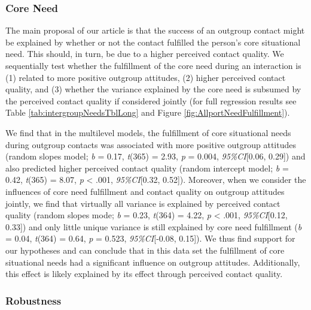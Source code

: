 \subsubsection{Core Need}

The main proposal of our article is that the success of an outgroup
contact might be explained by whether or not the contact fulfilled the
person's core situational need. This should, in turn, be due to a higher
perceived contact quality. We sequentially test whether the fulfillment
of the core need during an interaction is (1) related to more positive
outgroup attitudes, (2) higher perceived contact quality, and (3)
whether the variance explained by the core need is subsumed by the
perceived contact quality if considered jointly (for full regression
results see Table \ref{tab:intergroupNeedsTblLong} and Figure
\ref{fig:AllportNeedFulfillment}).

We find that in the multilevel models, the fulfillment of core
situational needs during outgroup contacts was associated with more
positive outgroup attitudes (random slopes model; \textit{b} = 0.17,
\textit{t}(365) = 2.93, \textit{p} = 0.004, \textit{95\%CI}{[}0.06,
0.29{]}) and also predicted higher perceived contact quality (random
intercept model; \textit{b} = 0.42, \textit{t}(365) = 8.07, \textit{p}
\textless{} .001, \textit{95\%CI}{[}0.32, 0.52{]}). Moreover, when we
consider the influences of core need fulfillment and contact quality on
outgroup attitudes jointly, we find that virtually all variance is
explained by perceived contact quality (random slopes mode; \textit{b} =
0.23, \textit{t}(364) = 4.22, \textit{p} \textless{} .001,
\textit{95\%CI}{[}0.12, 0.33{]}) and only little unique variance is
still explained by core need fulfillment (\textit{b} = 0.04,
\textit{t}(364) = 0.64, \textit{p} = 0.523, \textit{95\%CI}{[}-0.08,
0.15{]}). We thus find support for our hypotheses and can conclude that
in this data set the fulfillment of core situational needs had a
significant influence on outgroup attitudes. Additionally, this effect
is likely explained by its effect through perceived contact quality.

\subsubsection{Robustness}

